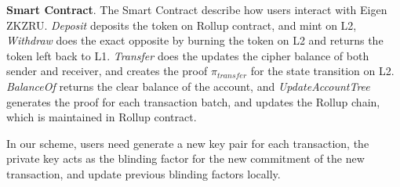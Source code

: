 \documentclass{article}
\begin{document}
\textbf{Smart Contract}. The Smart Contract describe how users interact with Eigen ZKZRU. \textit{Deposit} deposits the token on Rollup contract, and mint on L2, \textit{Withdraw} does the exact opposite by burning the token on L2 and returns the token left back to L1. \textit{Transfer} does the updates the cipher balance of both sender and receiver, and creates the proof $\pi_{transfer}$ for the state transition on L2.  \textit{BalanceOf} returns the clear balance of the account, and \textit{UpdateAccountTree} generates the proof for each transaction batch, and updates the Rollup chain, which is maintained in Rollup contract.

In our scheme, users need generate a new key pair for each transaction, the private key acts as the blinding factor for the new commitment of the new transaction, and update previous blinding factors locally.
\end{document}
